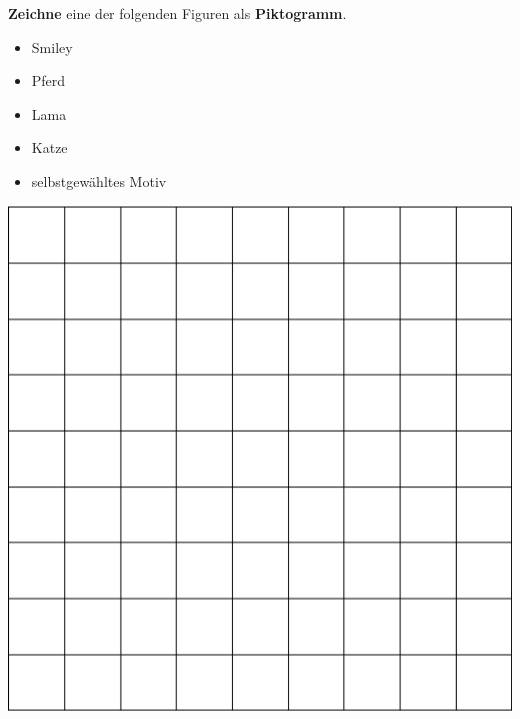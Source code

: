 \documentclass[a4paper, 12pt]{article}
\begin{document}
\aufgabe{}
	\begin{minipage}{0.65\textwidth}\vspace{0pt}
		\textbf{Zeichne} eine der folgenden Figuren als \textbf{Piktogramm}.

		\begin{itemize}
			\setlength\itemsep{-0.2em}
			\item Smiley
			\item Pferd
			\item Lama
			\item Katze
			\item selbstgewähltes Motiv
		\end{itemize}

	\end{minipage}
	\hfill
	\begin{minipage}{0.25\textwidth}\vspace{0pt}
		\includegraphics[width=\linewidth]{A_2.png}
	\end{minipage}
\end{document}
